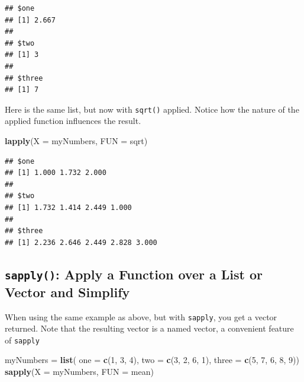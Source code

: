 \documentclass[]{book}
\newenvironment{Shaded}{\begin{snugshade}}{\end{snugshade}}
\newcommand{\DataTypeTok}[1]{\textcolor[rgb]{0.13,0.29,0.53}{#1}}
\newcommand{\DecValTok}[1]{\textcolor[rgb]{0.00,0.00,0.81}{#1}}
\newcommand{\KeywordTok}[1]{\textcolor[rgb]{0.13,0.29,0.53}{\textbf{#1}}}
\newcommand{\NormalTok}[1]{#1}
\newcommand{\StringTok}[1]{\textcolor[rgb]{0.31,0.60,0.02}{#1}}
\begin{document}
\begin{verbatim}
## $one
## [1] 2.667
## 
## $two
## [1] 3
## 
## $three
## [1] 7
\end{verbatim}

Here is the same list, but now with \texttt{sqrt()} applied. Notice how the nature of the applied function influences the result.

\begin{Shaded}
\begin{Highlighting}[]
\KeywordTok{lapply}\NormalTok{(}\DataTypeTok{X =}\NormalTok{ myNumbers, }\DataTypeTok{FUN =}\NormalTok{ sqrt)}
\end{Highlighting}
\end{Shaded}

\begin{verbatim}
## $one
## [1] 1.000 1.732 2.000
## 
## $two
## [1] 1.732 1.414 2.449 1.000
## 
## $three
## [1] 2.236 2.646 2.449 2.828 3.000
\end{verbatim}

\hypertarget{sapply-apply-a-function-over-a-list-or-vector-and-simplify}{%
\subsection{\texorpdfstring{\texttt{sapply()}: Apply a Function over a List or Vector and Simplify}{sapply(): Apply a Function over a List or Vector and Simplify}}\label{sapply-apply-a-function-over-a-list-or-vector-and-simplify}}

When using the same example as above, but with \texttt{sapply}, you get a vector returned. Note that the resulting vector is a named vector, a convenient feature of \texttt{sapply}

\begin{Shaded}
\begin{Highlighting}[]
\NormalTok{myNumbers =}\StringTok{ }\KeywordTok{list}\NormalTok{(}
    \DataTypeTok{one =} \KeywordTok{c}\NormalTok{(}\DecValTok{1}\NormalTok{, }\DecValTok{3}\NormalTok{, }\DecValTok{4}\NormalTok{),}
    \DataTypeTok{two =} \KeywordTok{c}\NormalTok{(}\DecValTok{3}\NormalTok{, }\DecValTok{2}\NormalTok{, }\DecValTok{6}\NormalTok{, }\DecValTok{1}\NormalTok{),}
    \DataTypeTok{three =} \KeywordTok{c}\NormalTok{(}\DecValTok{5}\NormalTok{, }\DecValTok{7}\NormalTok{, }\DecValTok{6}\NormalTok{, }\DecValTok{8}\NormalTok{, }\DecValTok{9}\NormalTok{))}
\KeywordTok{sapply}\NormalTok{(}\DataTypeTok{X =}\NormalTok{ myNumbers, }\DataTypeTok{FUN =}\NormalTok{ mean)}
\end{Highlighting}
\end{Shaded}
\end{document}
